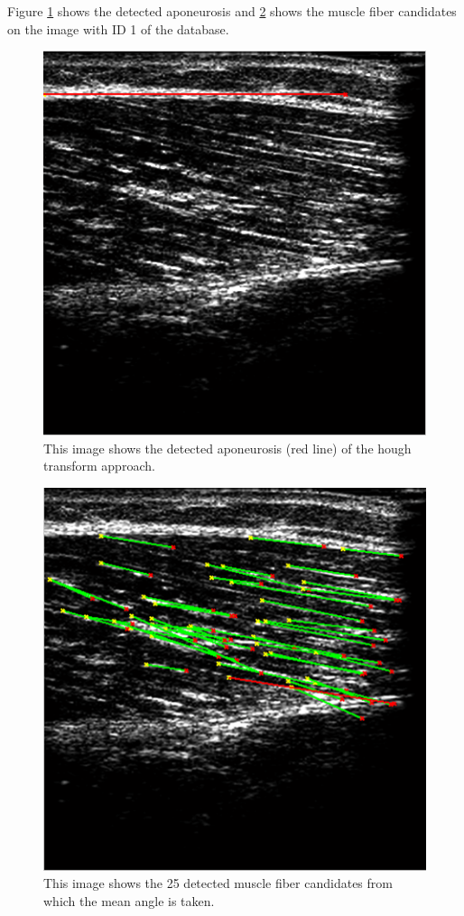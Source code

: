 \documentclass[10pt,twocolumn,letterpaper]{article}
\begin{document}
Figure \ref{fig:im1_hough_apo} shows the detected aponeurosis and \ref{fig:im1_hough_fibers} shows the muscle fiber candidates on the image with ID 1 of the database.

\begin{figure}
	\begin{center}		
		\includegraphics[width=0.7\linewidth]{img/im1_hough_apo}
	\end{center}
	\caption{This image shows the detected aponeurosis (red line) of the hough transform approach.}
	\label{fig:im1_hough_apo}
	
\end{figure}

\begin{figure}
	\begin{center}		
		\includegraphics[width=0.7\linewidth]{img/im1_hough_fibers}
	\end{center}
	\caption{This image shows the 25 detected muscle fiber candidates from which the mean angle is taken.}
	\label{fig:im1_hough_fibers}
	
\end{figure}
\end{document}
